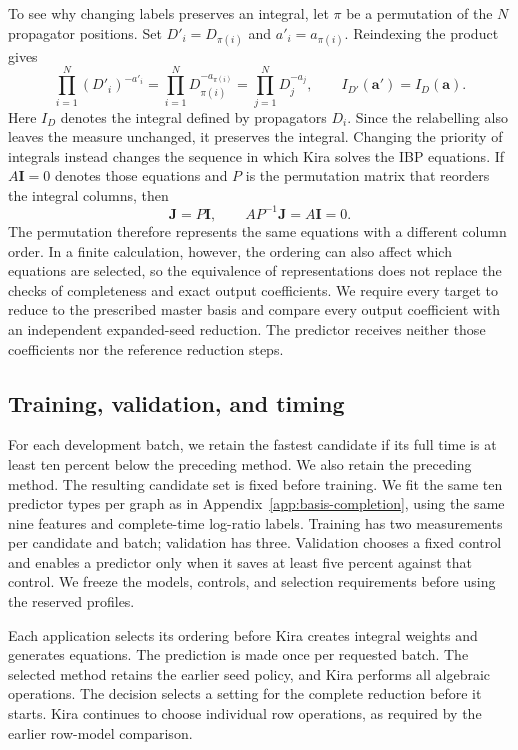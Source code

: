To see why changing labels preserves an integral, let $\pi$ be a
permutation of the $N$ propagator positions. Set
$D'_i=D_{\pi(i)}$ and $a'_i=a_{\pi(i)}$. Reindexing the product gives
\begin{equation}
 \prod_{i=1}^{N}(D'_i)^{-a'_i}
 =\prod_{i=1}^{N}D_{\pi(i)}^{-a_{\pi(i)}}
 =\prod_{j=1}^{N}D_j^{-a_j},
 \qquad I_{D'}(\mathbf a')=I_D(\mathbf a).
 \label{eq:order-relabel}
\end{equation}
Here $I_D$ denotes the integral defined by propagators $D_i$. Since the relabelling also leaves the measure unchanged, it preserves the integral. Changing the priority of integrals instead changes the sequence in which Kira solves the IBP equations. If $A\mathbf I=0$ denotes
those equations and $P$ is the permutation matrix that reorders the integral columns, then
\begin{equation}
 \mathbf J=P\mathbf I,\qquad
 AP^{-1}\mathbf J=A\mathbf I=0.
 \label{eq:order-system}
\end{equation}
The permutation therefore represents the same equations with a different column order. In a finite calculation, however, the ordering can also affect which equations are selected, so the equivalence of representations does not replace the checks of completeness and exact output coefficients.
We require every target to reduce to the prescribed master basis and
compare every output coefficient with an independent expanded-seed
reduction. The predictor receives neither those coefficients nor the
reference reduction steps.

\subsection{Training, validation, and timing}
For each development batch, we retain the fastest candidate if its full
time is at least ten percent below the preceding method. We also retain
the preceding method. The resulting candidate set is fixed before training.
We fit the same ten predictor types per graph as in
Appendix~\ref{app:basis-completion}, using the same nine features and
complete-time log-ratio labels. Training has two measurements per
candidate and batch; validation has three. Validation chooses a fixed
control and enables a predictor only when it saves at least five percent
against that control. We freeze the models, controls, and selection requirements before
using the reserved profiles.

Each application selects its ordering before Kira creates integral weights
and generates equations. The prediction is made once per requested batch.
The selected method retains the earlier seed policy, and Kira performs all
algebraic operations. The decision selects a setting for the complete reduction before it starts. Kira continues to choose individual row operations, as required by the earlier row-model comparison.


